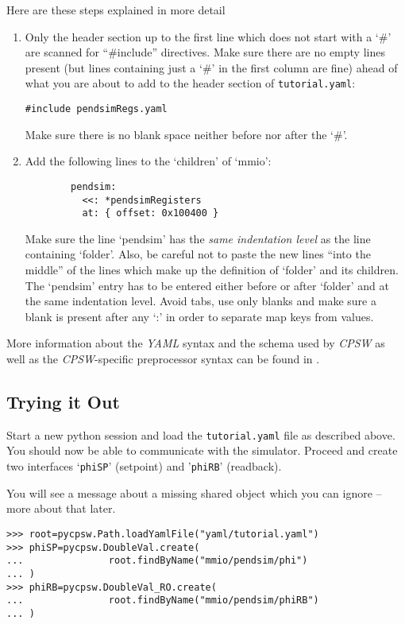 \documentclass[10pt]{article}
\newcommand{\ita}[1]{\emph{#1}}
\newcommand{\cpsw}      {\ita {CPSW}}
\newcommand{\yaml}      {\ita {YAML}}
\newcommand{\py}        {python}
\newcommand{\cod}[1] {{\tt#1}}
\newcommand{\tutyaml} {\cod{tutorial.yaml}}
\begin{document}
Here are these steps explained in more detail

\begin{enumerate}
\item Only the header section up to the first line which does not start with a `\#'
      are scanned for ``\#include'' directives. Make sure there are no empty lines
      present (but lines containing just a `\#' in the first column are fine) ahead
      of what you are about to add to the header section of \tutyaml{}:
\begin{verbatim}
#include pendsimRegs.yaml
\end{verbatim}
      Make sure there is no blank space neither before nor after the `\#'.

\item Add the following lines to the `children' of `mmio':
\begin{verbatim}
        pendsim:
          <<: *pendsimRegisters
          at: { offset: 0x100400 }
\end{verbatim}
      Make sure the line `pendsim' has the {\em same indentation level} as the
      line containing `folder'. Also, be careful not to paste the new lines ``into
      the middle'' of the lines which make up the definition of `folder' and its
      children. The `pendsim' entry has to be entered either before or after `folder'
      and at the same indentation level. Avoid tabs, use only blanks and make sure
      a blank is present after any `:' in order to separate map keys from values.
\end{enumerate}

More information about the \yaml{} syntax and the schema used by \cpsw{} as
well as the \cpsw{}-specific preprocessor syntax can be found in \cite{yaml,yamlDefinition}.

\subsection{Trying it Out}
Start a new \py{} session and load the \tutyaml{} file as described above.
You should now be able to communicate with the simulator. Proceed and
create two interfaces `\cod{phiSP}' (setpoint) and '\cod{phiRB}' (readback).

You will see a message about a missing shared object which you can ignore --
more about that later.

\begin{verbatim}
>>> root=pycpsw.Path.loadYamlFile("yaml/tutorial.yaml")
>>> phiSP=pycpsw.DoubleVal.create(
...               root.findByName("mmio/pendsim/phi")
... )
>>> phiRB=pycpsw.DoubleVal_RO.create(
...               root.findByName("mmio/pendsim/phiRB")
... )
\end{verbatim}
\end{document}
